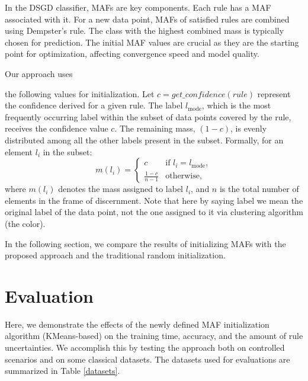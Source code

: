 \documentclass[10pt,a4paper,oneside]{article}
\begin{document}
{\color{black}In the DSGD classifier, MAFs are key components. Each rule has a MAF associated with it. For a new data point, MAFs of satisfied rules are combined using Dempster's rule. The class with the highest combined mass is typically chosen for prediction. The initial MAF values are crucial as they are the starting point for optimization, affecting convergence speed and model quality.

Our approach uses} the following values for initialization. Let $c = get\_confidence(rule)$ represent the confidence derived for a given rule. The label $l_{\text{mode}}$, which is the most frequently occurring label within the subset of data points covered by the rule, receives the confidence value $c$. The remaining mass, $(1 - c)$, is evenly distributed among all the other labels present in the subset. Formally, for an element $l_i$ in the subset:
\[
m(l_i) = 
\begin{cases} 
c & \text{if } l_i = l_{\text{mode}}, \\
\frac{1-c}{n-1} & \text{otherwise},
\end{cases}
\]
where $m(l_i)$ denotes the mass assigned to label $l_i$, and $n$ is the total number of elements in the frame of discernment. Note that here by saying label we mean the original label of the data point, not the one assigned to it via clustering algorithm (the color). 

{\color{black}In the following section, we compare the results of initializing MAFs with the proposed approach and the traditional random initialization.}

\section{Evaluation}\label{3}
Here{\color{black},} we demonstrate the effects of the newly defined MAF initialization algorithm (KMeans-based) on the training time, accuracy, and the amount of rule uncertainties. We accomplish this by testing the approach both on controlled scenarios and on some classical datasets. The datasets used for evaluations are summarized in Table \ref{datasets}. 
\\
\renewcommand{\arraystretch}{1.15}   %
\end{document}
